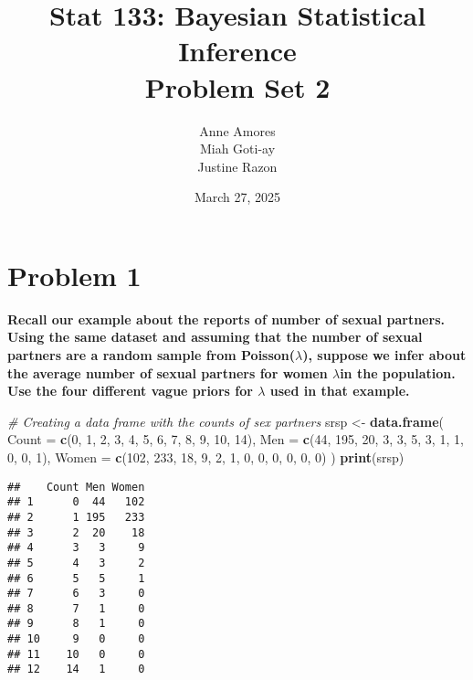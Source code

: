\documentclass[]{article}
\author{}
\date{\vspace{-2.5em}}
\title{Stat 133: Bayesian Statistical Inference \\ Problem Set 2}
\author{Anne Amores \\ Miah Goti-ay \\ Justine Razon}
\date{March 27, 2025}
\newenvironment{Shaded}{\begin{snugshade}}{\end{snugshade}}
\newcommand{\AttributeTok}[1]{\textcolor[rgb]{0.13,0.29,0.53}{#1}}
\newcommand{\CommentTok}[1]{\textcolor[rgb]{0.56,0.35,0.01}{\textit{#1}}}
\newcommand{\DecValTok}[1]{\textcolor[rgb]{0.00,0.00,0.81}{#1}}
\newcommand{\FunctionTok}[1]{\textcolor[rgb]{0.13,0.29,0.53}{\textbf{#1}}}
\newcommand{\NormalTok}[1]{#1}
\newcommand{\OtherTok}[1]{\textcolor[rgb]{0.56,0.35,0.01}{#1}}
\begin{document}
\maketitle

\section{Problem 1}
\textbf{Recall our example about the reports of number of sexual partners. Using the same dataset and assuming that the number of sexual partners are a random sample from Poisson($\lambda$), suppose we infer about the average number of sexual partners for women $\lambda$in the population. Use the four different vague priors for $\lambda$ used in that example.} \\


\begin{Shaded}
\begin{Highlighting}[]
\CommentTok{\# Creating a data frame with the counts of sex partners}
\NormalTok{srsp }\OtherTok{\textless{}{-}} \FunctionTok{data.frame}\NormalTok{(}
  \AttributeTok{Count =} \FunctionTok{c}\NormalTok{(}\DecValTok{0}\NormalTok{, }\DecValTok{1}\NormalTok{, }\DecValTok{2}\NormalTok{, }\DecValTok{3}\NormalTok{, }\DecValTok{4}\NormalTok{, }\DecValTok{5}\NormalTok{, }\DecValTok{6}\NormalTok{, }\DecValTok{7}\NormalTok{, }\DecValTok{8}\NormalTok{, }\DecValTok{9}\NormalTok{, }\DecValTok{10}\NormalTok{, }\DecValTok{14}\NormalTok{),}
  \AttributeTok{Men =} \FunctionTok{c}\NormalTok{(}\DecValTok{44}\NormalTok{, }\DecValTok{195}\NormalTok{, }\DecValTok{20}\NormalTok{, }\DecValTok{3}\NormalTok{, }\DecValTok{3}\NormalTok{, }\DecValTok{5}\NormalTok{, }\DecValTok{3}\NormalTok{, }\DecValTok{1}\NormalTok{, }\DecValTok{1}\NormalTok{, }\DecValTok{0}\NormalTok{, }\DecValTok{0}\NormalTok{, }\DecValTok{1}\NormalTok{),}
  \AttributeTok{Women =} \FunctionTok{c}\NormalTok{(}\DecValTok{102}\NormalTok{, }\DecValTok{233}\NormalTok{, }\DecValTok{18}\NormalTok{, }\DecValTok{9}\NormalTok{, }\DecValTok{2}\NormalTok{, }\DecValTok{1}\NormalTok{, }\DecValTok{0}\NormalTok{, }\DecValTok{0}\NormalTok{, }\DecValTok{0}\NormalTok{, }\DecValTok{0}\NormalTok{, }\DecValTok{0}\NormalTok{, }\DecValTok{0}\NormalTok{)}
\NormalTok{)}
\FunctionTok{print}\NormalTok{(srsp)}
\end{Highlighting}
\end{Shaded}

\begin{verbatim}
##    Count Men Women
## 1      0  44   102
## 2      1 195   233
## 3      2  20    18
## 4      3   3     9
## 5      4   3     2
## 6      5   5     1
## 7      6   3     0
## 8      7   1     0
## 9      8   1     0
## 10     9   0     0
## 11    10   0     0
## 12    14   1     0
\end{verbatim}
\end{document}
